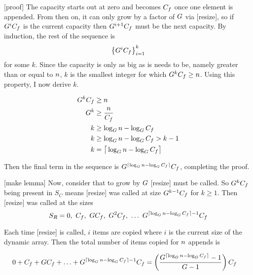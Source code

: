 [proof]
The capacity starts out at zero and becomes $C_f$ once one element is appended. From then on, it can only grow by a factor of $G$ via [resize], so if $G^iC_f$ is the current capacity then $G^{i + 1}C_f$ must be the next capacity. By induction, the rest of the sequence is $$\left\{ G^iC_f \right\}_{i = 1}^k$$ for some $k$. Since the capacity is only as big as is needs to be, namely greater than or equal to $n$, $k$ is the smallest integer for which $G^kC_f \geq n$. Using this property, I now derive $k$.

\begin{align*}
G^kC_f &\geq n\\
G^k &\geq \frac{n}{C_f}\\
k &\geq \log_{G} n - \log_{G} C_f\\
k &\geq \log_{G} n - \log_{G} C_f > k - 1\\
k &= \big\lceil \log_{G} n - \log_{G} C_f \big\rceil
\end{align*}

Then the final term in the sequence is $G^{\lceil \log_{G} n - \log_{G} C_f \rceil}C_f$, completing the proof.

[make lemma]
Now, consider that to grow by $G$ [resize] must be called. So $G^kC_f$ being present in $S_C$ means [resize] was called at size $G^{k - 1}C_f$ for $k \geq 1$. Then [resize] was called at the sizes $$S_R = 0,\ \initcapacity,\ \growthfactor\initcapacity,\ \growthfactor^2\initcapacity,\ \ldots\ \growthfactor^{\lceil \log_{\growthfactor} \varnitems - \log_{\growthfactor} \initcapacity \rceil - 1}\initcapacity$$

Each time [resize] is called, $i$ items are copied where $i$ is the current size of the dynamic array. Then the total number of items copied for $n$ appends is

\begin{align*}
0 + C_f + GC_f + \ldots + G^{\lceil \log_{G} n - \log_{G} C_f \rceil - 1}C_f &= \left( \frac{G^{\lceil \log_{G} n - \log_{G} C_f \rceil} - 1}{G - 1} \right) C_f
\end{align*}

